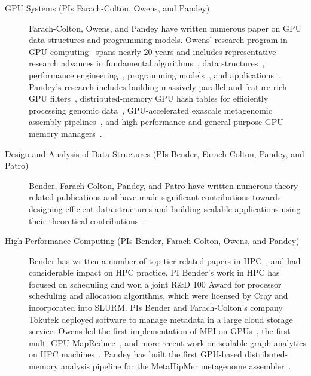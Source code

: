 \begin{description}%

    \item[GPU Systems (PIs Farach-Colton, Owens, and Pandey)] Farach-Colton, Owens, and Pandey have written numerous paper on GPU data structures and programming models. Owens' research program in GPU computing~\cite{Owens:2007:ASO,Owens:2008:GC} spans nearly 20 years and includes representative research advances in fundamental algorithms~\cite{Sengupta:2007:SPF}, data structures~\cite{Lefohn:2006:GGE,Alcantara:2009:RPH}, %
    performance engineering~\cite{Zhang:2011:AQP}, programming models~\cite{Gupta:2012:ASO, Tzeng:2010:TMF}, and applications~\cite{Wang:2017:GGG}. Pandey's research includes building massively parallel and feature-rich GPU filters~\cite{mccoy2022high}, distributed-memory GPU hash tables for efficiently processing genomic data~\cite{nisa2021distributed}, GPU-accelerated exascale metagenomic assembly pipelines~\cite{McCoyHYP23a}, and high-performance and general-purpose GPU memory managers~\cite{McCoyP24}.

    \item[Design and Analysis of Data Structures (PIs Bender, Farach-Colton, Pandey, and Patro)]
    Bender, Farach-Colton, Pandey, and Patro have written numerous theory related publications and have made significant contributions towards designing efficient data structures and building scalable applications using their theoretical contributions~\cite{BenderFaGo18,BenderFaJo12,PandeyBJ17,PandeyAlBe18,PandeyBJP17,PandeyBeJo17b,ConwayFaSh18,JannenYuZh15a,JannenYuZh15b,YuanZhJa16,pandey2021terrace,pandey2021variantstore,PandeyBeCo23,Assadi2023,Bender2023,pandey2020timely,PandeyCDBFJ21,mccoy2022high,Almodaresi2018Pufferfish,fan2023spt,Khan2021,Khan2022,Khan2023CapsSA,fan2023fulgor,Pibiri2023MacDBG}.


    \item[High-Performance Computing (PIs Bender, Farach-Colton, Owens, and
        Pandey)] Bender has
      written a number of top-tier related papers in HPC~\cite{pandey2020timely,bender2017two,eckstein2015pebbl,agrawal1989four,bender2008communication,greenberg1999enabling},
      and had considerable impact on HPC practice.
      PI Bender's work in HPC has focused on scheduling and  won a joint R\&D 100 Award for processor scheduling and allocation algorithms, which were licensed by Cray and incorporated into SLURM\@.  PIs Bender and Farach-Colton's company Tokutek deployed software to manage metadata in a large cloud storage service. Owens led the first implementation of MPI on GPUs~\cite{Stuart:2009:MPO:withouturl,Stuart:2011:EMT}, the first multi-GPU MapReduce~\cite{Stuart:2011:MMO}, and more recent work on scalable graph analytics on HPC machines~\cite{Pan:2018:SBS,Pan:2017:MGA,Chen:2022:SIP}. Pandey has built the first GPU-based distributed-memory \kmer analysis pipeline for the MetaHipMer metagenome assembler~\cite{nisa2021distributed}.


\end{description}

